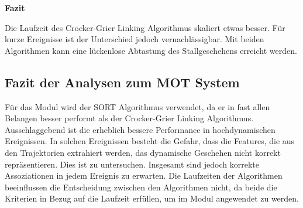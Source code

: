 \clearpage
\textbf{Fazit}\par
Die Laufzeit des Crocker-Grier Linking Algorithmus skaliert etwas besser. Für kurze Ereignisse ist der Unterschied jedoch vernachlässigbar. Mit beiden Algorithmen kann eine lückenlose Abtastung des Stallgeschehens erreicht werden.

\subsection{Fazit der Analysen zum MOT System}
Für das Modul wird der SORT Algorithmus verwendet, da er in fast allen Belangen besser performt als der Crocker-Grier Linking Algorithmus. Ausschlaggebend ist die erheblich bessere Performance in hochdynamischen Ereignissen. In solchen Ereignissen besteht die Gefahr, dass die Features, die aus den Trajektorien extrahiert werden, das dynamische Geschehen nicht korrekt repräsentieren. Dies ist zu untersuchen. Insgesamt sind jedoch korrekte Assoziationen in jedem Ereignis zu erwarten. Die Laufzeiten der Algorithmen beeinflussen die Entscheidung zwischen den Algorithmen nicht, da beide die Kriterien in Bezug auf die Laufzeit erfüllen, um im Modul angewendet zu werden.